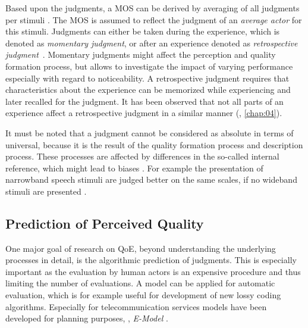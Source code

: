 Based upon the judgments, a \acf{MOS} can be derived by averaging of all judgments per stimuli \citep{itu-t_p.800.2:_2013}.
The \ac{MOS} is assumed to reflect the judgment of an \emph{average actor} for this stimuli.
Judgments can either be taken during the experience, which is denoted as \emph{momentary judgment}, or after an experience denoted as \emph{retrospective judgment}~\citep[\cf,][]{weiss_temporal_2014}.
Momentary judgments might affect the perception and quality formation process, but allows to investigate the impact of varying performance especially with regard to noticeability.
A retrospective judgment requires that characteristics about the experience can be memorized while experiencing and later recalled for the judgment.
It has been observed that not all parts of an experience affect a retrospective judgment in a similar manner (\cf, \autoref{chap:04}).

It must be noted that a judgment cannot be considered as absolute in terms of universal, because it is the result of the quality formation process and description process.
These processes are affected by differences in the so-called internal reference, which might lead to biases \citep[\cf,][]{zielinski_biases_2008, pitrey_aligning_2011}.
For example the presentation of narrowband speech stimuli are judged better on the same scales, if no wideband stimuli are presented \citep[\cf,][]{koster_comparison_2015}.

\subsection{Prediction of Perceived Quality}
One major goal of research on \ac{QoE}, beyond understanding the underlying processes in detail, is the algorithmic prediction of judgments.
This is especially important as the evaluation by human actors is an expensive procedure and thus limiting the number of evaluations.
A model can be applied for automatic evaluation, which is for example useful for development of new lossy coding algorithms.
Especially for telecommunication services models have been developed for planning purposes, \eg, \emph{E-Model} \citep{itu-t_g.107:_2015}.



